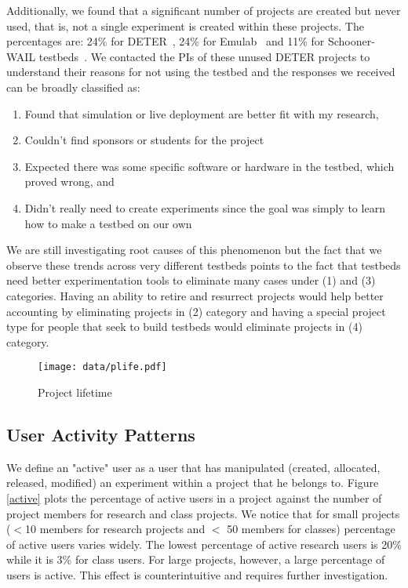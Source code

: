 \documentclass[12pt]{article}
\begin{document}
Additionally, we found that
 a significant number of projects are created but never used,  that is, 
  not a single experiment is created within these projects. 
The percentages are: 24\% for DETER~\cite{Deter}, 24\% for Emulab~\cite{Emulab} 
 and 11\% for Schooner-WAIL testbeds~\cite{Wail}. 
We contacted the PIs of these unused DETER projects to understand their reasons for not using the 
 testbed and the responses we received can be broadly classified as: 
\begin{enumerate}
\item Found that simulation or live deployment are better fit with my research, 
\item Couldn't find sponsors or students for the project
\item Expected there was some specific software or hardware in the testbed, which proved wrong, and
\item Didn't really need to create experiments since the goal was simply to learn how to make a testbed on our own
\end{enumerate}
We are still investigating root causes of this phenomenon but the fact
that we observe these trends across very different testbeds points to the fact that
testbeds need better experimentation tools to eliminate many
cases under (1) and (3) categories. Having an ability to retire and resurrect projects would help 
better accounting by eliminating projects in (2) category and having a special project type for 
people that seek to build testbeds would eliminate projects in (4) category.

\begin{figure}[htbp]
\begin{center}
\texttt{[image: data/plife.pdf]}
\caption{Project lifetime}
\label{projlife}
\end{center}
\end{figure}


\subsection*{User Activity Patterns}
We define an "active" user as a user that has manipulated (created,
allocated, released, modified) an experiment within a project that
he belongs to. Figure \ref{active} plots the percentage of active users
in a project against the number of project members for research and
class projects. We notice that for small projects ($<$10 members for
research projects and $<$ 50 members for classes) percentage of active
users varies widely. The lowest percentage of active research users is
20\% while it is 3\% for class users. For large projects, however, a
large percentage of users is active. This effect is counterintuitive and
requires further investigation.
\end{document}
